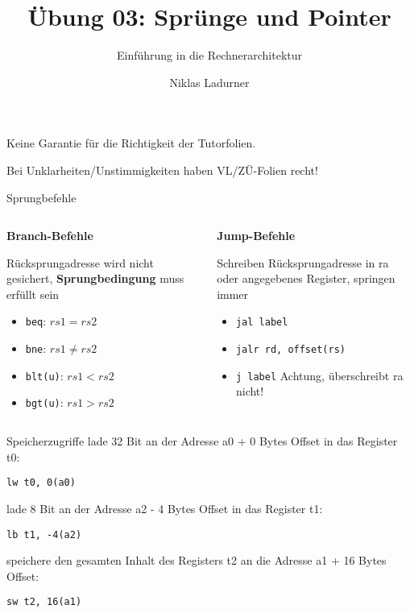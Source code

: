 \documentclass[
  german,            %
  aspectratio=169,    %
]{tumbeamer}
\title{Übung 03: Sprünge und Pointer}
\subtitle{Einführung in die Rechnerarchitektur}
\author{Niklas Ladurner}
\institute{\theChairName\\\theDepartmentName\\\theUniversityName}
\date{\DTMdisplaydate{2024}{11}{1}{-1}}
\begin{document}
\maketitle

\begin{frame}[c]{}{}
  \begin{center}
    \LARGE  Keine Garantie für die Richtigkeit der Tutorfolien.

    \Large Bei Unklarheiten/Unstimmigkeiten haben VL/ZÜ-Folien recht!
  \end{center}
\end{frame}

\begin{frame}[c, fragile]{Sprungbefehle}{}
  \begin{columns}
    \begin{column}{0.5\textwidth}
      \begin{center}\textbf{Branch-Befehle}\end{center}
      Rücksprungadresse wird nicht gesichert, \textbf{Sprungbedingung}
      muss erfüllt sein
      \begin{itemize}
        \item \verb|beq|: $rs1 = rs2$
        \item \verb|bne|: $rs1 \ne rs2$
        \item \verb|blt(u)|: $rs1 < rs2$
        \item \verb|bgt(u)|: $rs1 > rs2$
      \end{itemize}
    \end{column}
    \begin{column}{0.5\textwidth}
      \begin{center}\textbf{Jump-Befehle}\end{center}
      Schreiben Rücksprungadresse in ra oder angegebenes Register,
      springen immer
      \begin{itemize}
        \item \verb|jal label|
        \item \verb|jalr rd, offset(rs)|
        \item \verb|j label| Achtung, überschreibt ra nicht!
      \end{itemize}
    \end{column}
  \end{columns}
\end{frame}

\begin{frame}[c, fragile]{Speicherzugriffe}{}
  lade 32 Bit an der Adresse a0 + 0 Bytes Offset in das Register t0:
  \begin{verbatim}lw t0, 0(a0)\end{verbatim}
  lade 8 Bit an der Adresse a2 - 4 Bytes Offset in das Register t1:
  \begin{verbatim}lb t1, -4(a2)\end{verbatim}
  speichere den gesamten Inhalt des Registers t2 an die Adresse a1 + 16 Bytes Offset:
  \begin{verbatim}sw t2, 16(a1)\end{verbatim}
\end{frame}
\end{document}

